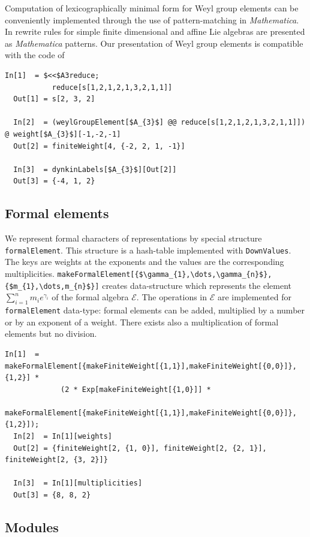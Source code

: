 Computation of lexicographically minimal form \cite{casselman1994machine,casselman1995automata} for Weyl group elements can be conveniently implemented through the use of pattern-matching in {\it Mathematica}. In \cite{KallenShortlex} rewrite rules for simple finite dimensional and affine Lie algebras are presented as {\it Mathematica} patterns. Our presentation of Weyl group elements is compatible with the code of \cite{KallenShortlex}
\begin{lstlisting}[mathescape=true]
  In[1]  = $<<$A3reduce;
           reduce[s[1,2,1,2,1,3,2,1,1]]
  Out[1] = s[2, 3, 2]

  In[2]  = (weylGroupElement[$A_{3}$] @@ reduce[s[1,2,1,2,1,3,2,1,1]]) @ weight[$A_{3}$][-1,-2,-1]
  Out[2] = finiteWeight[4, {-2, 2, 1, -1}]

  In[3]  = dynkinLabels[$A_{3}$][Out[2]]
  Out[3] = {-4, 1, 2}
\end{lstlisting}

\subsection{Formal elements}
\label{sec:formal-elements}

We represent formal characters of representations by special structure \lstinline{formalElement}. This structure is a hash-table implemented with \lstinline{DownValues}. The keys are weights at the exponents and the values are the  corresponding multiplicities. \lstinline[mathescape=true]!makeFormalElement[{$\gamma_{1},\dots,\gamma_{n}$},{$m_{1},\dots,m_{n}$}]! creates data-structure which represents the element $\sum_{i=1}^{n} m_{i} e^{\gamma_{i}}$ of the formal algebra $\mathcal{E}$. The operations in $\mathcal{E}$ are implemented for \lstinline{formalElement} data-type: formal elements can be added, multiplied by a number or by an exponent of a weight. There exists also a multiplication of formal elements but no division.
\begin{lstlisting}[mathescape=true]
  In[1]  = makeFormalElement[{makeFiniteWeight[{1,1}],makeFiniteWeight[{0,0}]},{1,2}] *
             (2 * Exp[makeFiniteWeight[{1,0}]] *
             makeFormalElement[{makeFiniteWeight[{1,1}],makeFiniteWeight[{0,0}]},{1,2}]);
  In[2]  = In[1][weights]
  Out[2] = {finiteWeight[2, {1, 0}], finiteWeight[2, {2, 1}], finiteWeight[2, {3, 2}]}

  In[3]  = In[1][multiplicities]
  Out[3] = {8, 8, 2}
\end{lstlisting}

\subsection{Modules}
\label{sec:modules}

